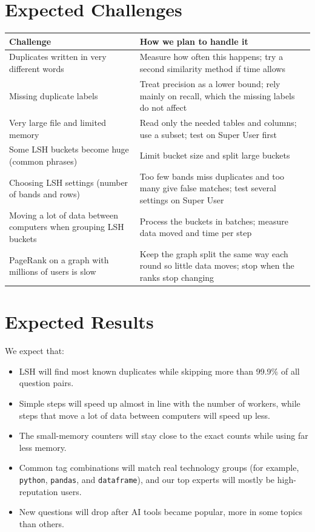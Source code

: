 \documentclass[11pt,a4paper]{article}
\begin{document}
\section{Expected Challenges}
{\small
\begin{tabularx}{\textwidth}{@{}p{6.3cm} Y@{}}
\toprule
\textbf{Challenge} & \textbf{How we plan to handle it} \\
\midrule
Duplicates written in very different words & Measure how often this happens; try a second similarity method if time allows \\
Missing duplicate labels & Treat precision as a lower bound; rely mainly on recall, which the missing labels do not affect \\
Very large file and limited memory & Read only the needed tables and columns; use a subset; test on Super User first \\
Some LSH buckets become huge (common phrases) & Limit bucket size and split large buckets \\
Choosing LSH settings (number of bands and rows) & Too few bands miss duplicates and too many give false matches; test several settings on Super User \\
Moving a lot of data between computers when grouping LSH buckets & Process the buckets in batches; measure data moved and time per step \\
PageRank on a graph with millions of users is slow & Keep the graph split the same way each round so little data moves; stop when the ranks stop changing \\
\bottomrule
\end{tabularx}}

\section{Expected Results}
We expect that:
\begin{itemize}
  \item LSH will find most known duplicates while skipping more than 99.9\% of
        all question pairs.
  \item Simple steps will speed up almost in line with the number of workers,
        while steps that move a lot of data between computers will speed up
        less.
  \item The small-memory counters will stay close to the exact counts while
        using far less memory.
  \item Common tag combinations will match real technology groups (for example,
        \texttt{python}, \texttt{pandas}, and \texttt{dataframe}), and our top
        experts will mostly be high-reputation users.
  \item New questions will drop after AI tools became popular, more in some
        topics than others.
\end{itemize}
\end{document}
